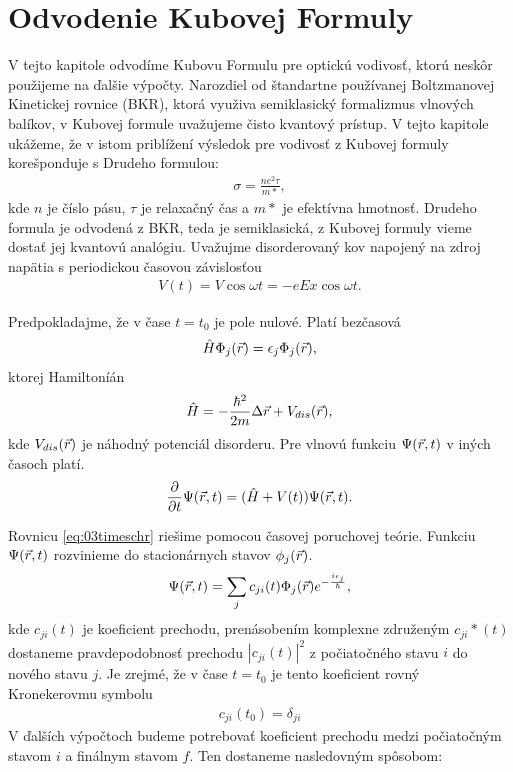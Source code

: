 \section{Odvodenie Kubovej Formuly}
\label{sec:kubo}
V tejto kapitole odvodíme Kubovu Formulu pre optickú vodivosť, ktorú neskôr použijeme na ďalšie výpočty.
Narozdiel od štandartne používanej Boltzmanovej Kinetickej rovnice (BKR), ktorá využiva semiklasický 
formalizmus vlnových balíkov, v Kubovej formule uvažujeme čisto kvantový prístup. V tejto kapitole 
ukážeme, že v istom priblížení výsledok pre vodivosť z Kubovej formuly korešponduje s Drudeho formulou:
\begin{align}
\label{eq:03drude}
\sigma=\frac{ne^2\tau}{m*}\mathrm{,}
\end{align}
kde $n$ je číslo pásu, $\tau$ je relaxačný čas a $m*$ je efektívna hmotnosť. Drudeho formula je odvodená z 
BKR, teda je semiklasická, z Kubovej formuly vieme dostať jej kvantovú analógiu.
Uvažujme disorderovaný kov napojený na zdroj napätia s periodickou časovou závislosťou
\begin{align}
\label{eq:03potential}
V(t)=V\cos \omega t = -eEx \cos \omega t \mathrm{.}
\end{align}

Predpokladajme, že v čase $t=t_0$ je pole nulové. Platí bezčasová \schr
\begin{align}
\label{eq:03schr}
\hat{H} \Phi_j(\vec{r})= \epsilon_j\Phi_j(\vec{r}) \mathrm{,}
\end{align}
ktorej Hamiltoníán
\begin{align}
\label{eq:03Hamiltonian}
\hat{H}= - \frac{\hbar^2}{2m}\Delta \vec{r} + V_{dis}(\vec{r}) \mathrm{,} 
\end{align}
kde $V_{dis}(\vec{r})$ je náhodný potenciál disorderu. Pre vlnovú funkciu $\Psi(\vec{r},t)$ v iných časoch platí. 
\begin{align}
\label{eq:03timeschr}
\frac{\partial}{\partial t} \Psi(\vec{r},t) = (\hat{H} + V(t))\Psi(\vec{r},t)\mathrm{.}
\end{align}

Rovnicu \eqref{eq:03timeschr}  riešime pomocou časovej poruchovej teórie. Funkciu $\Psi(\vec{r},t)$ rozvinieme do stacionárnych stavov $\phi_j(\vec{r})$. 
\begin{align}
\label{eq:03stac}
\Psi(\vec{r},t)=\sum_j c_{ji}(t)\Phi_j(\vec{r})e^{-\frac{i\epsilon_j}{\hbar}} \mathrm{,}
\end{align}
kde $c_{ji}(t)$ je koeficient prechodu, prenásobením komplexne združeným   $c_{ji}*(t)$ dostaneme pravdepodobnosť prechodu $|c_{ji}(t)|^2$ z počiatočného stavu $i$ do nového stavu $j$. Je zrejmé, že v čase $t=t_0$ je tento koeficient rovný Kronekerovmu symbolu
\begin{align}
\label{eq:03cji0}
c_{ji}(t_0)=\delta_{ji}
\end{align}  
V ďalších výpočtoch budeme potrebovať koeficient prechodu medzi počiatočným stavom $i$  a finálnym stavom $f$. Ten dostaneme nasledovným spôsobom:

